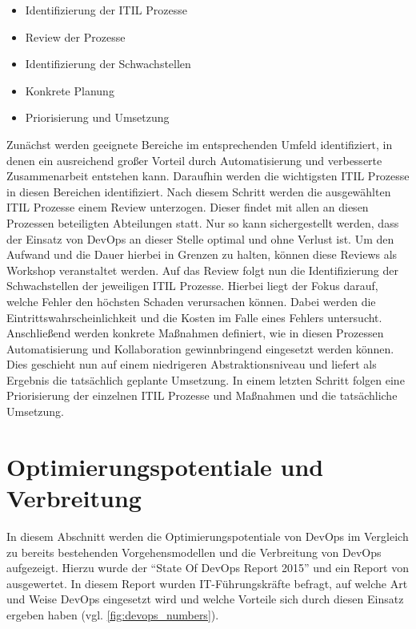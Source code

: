 \begin{itemize}
\item Identifizierung der ITIL Prozesse
\item Review der Prozesse
\item Identifizierung der Schwachstellen
\item Konkrete Planung
\item Priorisierung und Umsetzung
\end{itemize}

Zunächst werden geeignete Bereiche im entsprechenden Umfeld identifiziert, in denen ein ausreichend großer Vorteil durch Automatisierung und verbesserte Zusammenarbeit entstehen kann. 
Daraufhin werden die wichtigsten ITIL Prozesse in diesen Bereichen identifiziert. 
Nach diesem Schritt werden die ausgewählten ITIL Prozesse einem Review unterzogen. 
Dieser findet mit allen an diesen Prozessen beteiligten Abteilungen statt. 
Nur so kann sichergestellt werden, dass der Einsatz von DevOps an dieser Stelle optimal und ohne Verlust ist. 
Um den Aufwand und die Dauer hierbei in Grenzen zu halten, können diese Reviews als Workshop veranstaltet werden. 
Auf das Review folgt nun die Identifizierung der Schwachstellen der jeweiligen ITIL Prozesse. 
Hierbei liegt der Fokus darauf, welche Fehler den höchsten Schaden verursachen können. 
Dabei werden die Eintrittswahrscheinlichkeit und die Kosten im Falle eines Fehlers untersucht. 
Anschließend werden konkrete Maßnahmen definiert, wie in diesen Prozessen Automatisierung und Kollaboration gewinnbringend eingesetzt werden können. 
Dies geschieht nun auf einem niedrigeren Abstraktionsniveau und liefert als Ergebnis die tatsächlich geplante Umsetzung. 
In einem letzten Schritt folgen eine Priorisierung der einzelnen ITIL Prozesse und Maßnahmen und die tatsächliche Umsetzung. 
\parencite[Vgl.][S. 1 - 3]{Sharp-Paul:2016}

\section{Optimierungspotentiale und Verbreitung} \label{sec:optimierung} %
In diesem Abschnitt werden die Optimierungspotentiale von DevOps im Vergleich zu bereits bestehenden Vorgehensmodellen und die Verbreitung von DevOps aufgezeigt. 
Hierzu wurde der \enquote{State Of DevOps Report 2015} \parencite[][]{DevOpsSODR:2015} und ein Report von \parencite[][]{Gartner:2015} ausgewertet. 
In diesem Report wurden IT-Führungskräfte befragt, auf welche Art und Weise DevOps eingesetzt wird und welche Vorteile sich durch diesen Einsatz ergeben haben (vgl. \autoref{fig:devops_numbers}).

